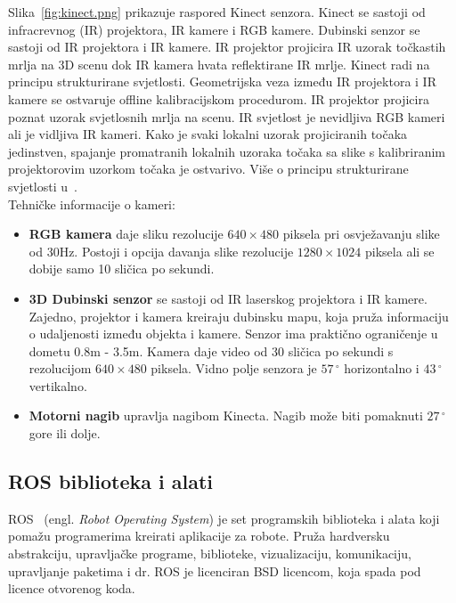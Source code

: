 Slika~\ref{fig:kinect.png} prikazuje raspored Kinect senzora. Kinect se
sastoji od infracrevnog (IR) projektora, IR kamere i RGB kamere.
Dubinski senzor se sastoji od IR projektora i IR kamere. IR projektor
projicira IR uzorak točkastih mrlja na 3D scenu dok IR kamera hvata
reflektirane IR mrlje. Kinect radi na principu strukturirane svjetlosti.
Geometrijska veza između IR projektora i IR kamere se ostvaruje offline
kalibracijskom procedurom. IR projektor projicira poznat uzorak
svjetlosnih mrlja na scenu. IR svjetlost je nevidljiva RGB kameri ali
je vidljiva IR kameri. Kako je svaki lokalni uzorak projiciranih točaka
jedinstven, spajanje promatranih lokalnih uzoraka točaka sa slike
s kalibriranim projektorovim uzorkom točaka je ostvarivo. Više o
principu strukturirane svjetlosti u~\cite{structured:light}.\\

Tehničke informacije o kameri:
\begin{itemize}
    \item \textbf{RGB kamera} daje sliku rezolucije \(640\times480\)
        piksela pri osvježavanju slike od 30Hz. Postoji i opcija davanja
        slike rezolucije \(1280 \times 1024\) piksela ali se dobije samo 10
        sličica po sekundi.
    \item \textbf{3D Dubinski senzor} se sastoji od IR laserskog
        projektora i IR kamere. Zajedno, projektor i kamera kreiraju
        dubinsku mapu, koja pruža informaciju o udaljenosti između
        objekta i kamere. Senzor ima praktično ograničenje u dometu 
        0.8m - 3.5m. Kamera daje video od 30 sličica po sekundi s
        rezolucijom \(640 \times 480\) piksela. Vidno polje senzora je
        \(57\,^{\circ}\) horizontalno i \(43\,^{\circ}\) vertikalno.
    \item \textbf{Motorni nagib} upravlja nagibom Kinecta. Nagib može
        biti pomaknuti \(27\,^{\circ}\) gore ili dolje.
\end{itemize}



\newpage
\subsection{ROS biblioteka i alati} %
\label{sub:ROS biblioteka i alati}

ROS~\cite{ros} (engl. \textit{Robot Operating System}) je set programskih
biblioteka i alata koji pomažu programerima kreirati aplikacije za
robote. Pruža hardversku abstrakciju, upravljačke programe, biblioteke,
vizualizaciju, komunikaciju, upravljanje paketima i dr. ROS je
licenciran BSD licencom, koja spada pod licence otvorenog koda.

